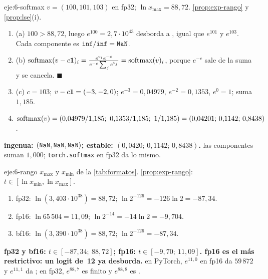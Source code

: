 \begin{solucion}{eje:6-softmax}
\datos $v=(100,101,103)$ en fp32; $\ln x_{\max}=88{,}72$.
\planteamiento \cref{prop:exp-rango} y \cref{prop:lse}(i).
\pasos
\begin{enumerate}[label=\arabic*.]
  \item (a) $100>88{,}72$, luego $e^{100}=2{,}7\cdot 10^{43}$ desborda a \Inf, igual que $e^{101}$ y $e^{103}$. Cada componente es $\Inf/\Inf=\NaN$.
  \item (b) $\operatorname{softmax}(v-c\mathbf{1})_i=\frac{e^{v_i}e^{-c}}{e^{-c}\sum_je^{v_j}}=\operatorname{softmax}(v)_i$, porque $e^{-c}$ sale de la suma y se cancela. $\blacksquare$
  \item (c) $c=103$; $v-c\mathbf{1}=(-3,-2,0)$; $e^{-3}=0{,}04979$, $e^{-2}=0{,}1353$, $e^{0}=1$; suma $1{,}185$.
  \item $\softmax(v)=(0{,}04979/1{,}185;\ 0{,}1353/1{,}185;\ 1/1{,}185)=(0{,}04201;\,0{,}1142;\,0{,}8438)$.
\end{enumerate}
\resultado \textbf{ingenua: $(\NaN,\NaN,\NaN)$; estable: $(0{,}0420;\,0{,}1142;\,0{,}8438)$.}
\comprobacion las componentes suman $1{,}000$; \texttt{torch.softmax} en fp32 da lo mismo.
\end{solucion}

\begin{solucion}{eje:6-rango}
\datos $x_{\max}$ y $x_{\min}$ de la \cref{tab:formatos}.
\planteamiento \cref{prop:exp-rango}: $t\in[\ln x_{\min},\ln x_{\max}]$.
\pasos
\begin{enumerate}[label=\arabic*.]
  \item fp32: $\ln(3{,}403\cdot 10^{38})=88{,}72$; $\ln 2^{-126}=-126\ln 2=-87{,}34$.
  \item fp16: $\ln 65\,504=11{,}09$; $\ln 2^{-14}=-14\ln 2=-9{,}704$.
  \item bf16: $\ln(3{,}390\cdot 10^{38})=88{,}72$; $\ln 2^{-126}=-87{,}34$.
\end{enumerate}
\resultado \textbf{fp32 y bf16: $t\in[-87{,}34;\ 88{,}72]$; fp16: $t\in[-9{,}70;\ 11{,}09]$. fp16 es el más restrictivo: un logit de~12 ya desborda.}
\comprobacion en PyTorch, $e^{11{,}0}$ en fp16 da $59\,872$ y $e^{11{,}1}$ da \Inf; en fp32, $e^{88{,}7}$ es finito y $e^{88{,}8}$ es \Inf.
\end{solucion}

